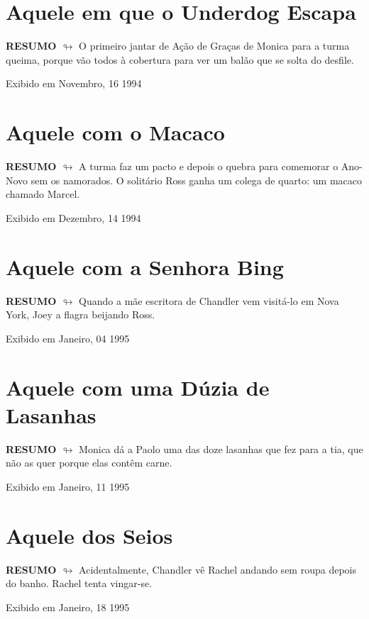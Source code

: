 \chapter{Aquele em que o Underdog Escapa}

\textbf{RESUMO $\looparrowright$} O primeiro jantar de Ação de Graças de Monica para a turma queima, porque vão todos à cobertura para ver um balão que se solta do desfile.

\begin{flushright}
\textcolor{gray600}{Exibido em Novembro, 16 1994}
\end{flushright}


\chapter{Aquele com o Macaco}

\textbf{RESUMO $\looparrowright$} A turma faz um pacto e depois o quebra para comemorar o Ano-Novo sem os namorados. O solitário Ross ganha um colega de quarto: um macaco chamado Marcel.

\begin{flushright}
\textcolor{gray600}{Exibido em Dezembro, 14 1994}
\end{flushright}


\chapter{Aquele com a Senhora Bing}

\textbf{RESUMO $\looparrowright$} Quando a mãe escritora de Chandler vem visitá-lo em Nova York, Joey a flagra beijando Ross.

\begin{flushright}
\textcolor{gray600}{Exibido em Janeiro, 04 1995}
\end{flushright}


\chapter{Aquele com uma Dúzia de Lasanhas}

\textbf{RESUMO $\looparrowright$} Monica dá a Paolo uma das doze lasanhas que fez para a tia, que não as quer porque elas contêm carne.

\begin{flushright}
\textcolor{gray600}{Exibido em Janeiro, 11 1995}
\end{flushright}


\chapter{Aquele dos Seios}

\textbf{RESUMO $\looparrowright$} Acidentalmente, Chandler vê Rachel andando sem roupa depois do banho. Rachel tenta vingar-se.

\begin{flushright}
\textcolor{gray600}{Exibido em Janeiro, 18 1995}
\end{flushright}


